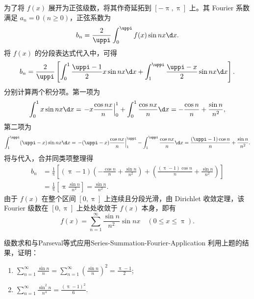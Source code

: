 \begin{myproof}
    为了将 $f(x)$ 展开为正弦级数，将其作奇延拓到 $[-\uppi, \uppi]$ 上。其 Fourier 系数满足 $a_n = 0 \ (n \geqslant 0)$，正弦系数为
    \begin{equation}\label{eq:sine-bn-integral}
        b_n = \frac{2}{\uppi} \int_{0}^{\uppi} f(x) \sin nx \d x.
    \end{equation}
    将 $f(x)$ 的分段表达式代入中，可得
    \begin{equation}\label{eq:sine-bn-calc}
        b_n = \frac{2}{\uppi} \left[ \int_{0}^{1} \frac{\uppi-1}{2} x \sin nx \d x + \int_{1}^{\uppi} \frac{\uppi-x}{2} \sin nx \d x \right].
    \end{equation}
    分别计算两个积分项。第一项为
    \begin{equation}\label{eq:sine-part1}
        \int_{0}^{1} x \sin nx \d x = \left. -x \frac{\cos nx}{n} \right|_{0}^{1} + \int_{0}^{1} \frac{\cos nx}{n} \d x = -\frac{\cos n}{n} + \frac{\sin n}{n^2},
    \end{equation}
    第二项为
    \begin{equation}\label{eq:sine-part2}
        \int_{1}^{\uppi} (\uppi-x) \sin nx \d x = \left. -(\uppi-x) \frac{\cos nx}{n} \right|_{1}^{\uppi} - \int_{1}^{\uppi} \frac{\cos nx}{n} \d x = \frac{(\uppi-1)\cos n}{n} + \frac{\sin n}{n^2}.
    \end{equation}
    将与代入，合并同类项整理得
    \begin{equation}\label{eq:sine-bn-final}
        \begin{aligned}
            b_n & = \frac{1}{\uppi} \left[ (\uppi-1) \left( -\frac{\cos n}{n} + \frac{\sin n}{n^2} \right) + \left( \frac{(\uppi-1)\cos n}{n} + \frac{\sin n}{n^2} \right) \right] \\
                & = \frac{1}{\uppi} \left[ \uppi \frac{\sin n}{n^2} \right] = \frac{\sin n}{n^2}.
        \end{aligned}
    \end{equation}
    由于 $f(x)$ 在整个区间 $[0, \uppi]$ 上连续且分段光滑，由 Dirichlet 收敛定理，该 Fourier 级数在 $[0, \uppi]$ 上处处收敛于 $f(x)$ 本身，即有
    \begin{equation}\label{eq:final-identity}
        f(x) = \sum_{n=1}^{\infty} \frac{\sin n}{n^2} \sin nx \quad (0 \leqslant x \leqslant \uppi).
    \end{equation}
\end{myproof}

\begin{problem}{级数求和与Parseval等式应用}{Series-Summation-Fourier-Application}
    利用上题的结果，证明：
    \begin{enumerate}
        \item $\sum_{n=1}^{\infty} \frac{\sin n}{n} = \sum_{n=1}^{\infty} \left(\frac{\sin n}{n}\right)^2 = \frac{\uppi-1}{2}$;
        \item $\sum_{n=1}^{\infty} \frac{\sin^2 n}{n^4} = \frac{(\uppi-1)^2}{6}$.
    \end{enumerate}
\end{problem}

